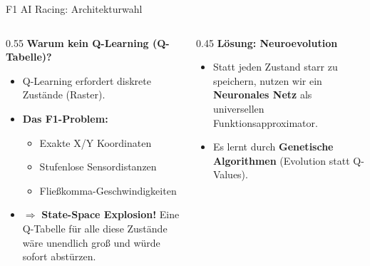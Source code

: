 \documentclass[aspectratio=169]{beamer}
\begin{document}
\begin{frame}{F1 AI Racing: Architekturwahl}
\scriptsize
\begin{columns}[T]
\begin{column}{0.55\textwidth}
\textbf{Warum kein Q-Learning (Q-Tabelle)?}
\begin{itemize}
    \item Q-Learning erfordert diskrete Zustände (Raster).
    \item \textbf{Das F1-Problem:} 
    \begin{itemize}
        \item Exakte X/Y Koordinaten
        \item Stufenlose Sensordistanzen
        \item Fließkomma-Geschwindigkeiten
    \end{itemize}
    \item $\Rightarrow$ \textbf{State-Space Explosion!} Eine Q-Tabelle für alle diese Zustände wäre unendlich groß und würde sofort abstürzen.
\end{itemize}
\end{column}
\begin{column}{0.45\textwidth}
\textbf{Lösung: Neuroevolution}
\begin{itemize}
    \item Statt jeden Zustand starr zu speichern, nutzen wir ein \textbf{Neuronales Netz} als universellen Funktionsapproximator.
    \item Es lernt durch \textbf{Genetische Algorithmen} (Evolution statt Q-Values).
\end{itemize}
\end{column}
\end{columns}

\vspace{-0.2cm}
\begin{center}
\end{center}
\end{frame}
\end{document}
